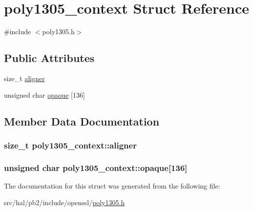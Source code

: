 \hypertarget{structpoly1305__context}{}\section{poly1305\+\_\+context Struct Reference}
\label{structpoly1305__context}


{\ttfamily \#include $<$poly1305.\+h$>$}

\subsection*{Public Attributes}
\begin{DoxyCompactItemize}
\item 
size\+\_\+t \hyperlink{structpoly1305__context_acbc79e70ed9f3a3c8f390b5cf90e1dbd}{aligner}
\item 
unsigned char \hyperlink{structpoly1305__context_a111e7a0f141ae3cb557d37efe613407a}{opaque} \mbox{[}136\mbox{]}
\end{DoxyCompactItemize}


\subsection{Member Data Documentation}
\subsubsection[{\texorpdfstring{aligner}{aligner}}]{\setlength{\rightskip}{0pt plus 5cm}size\+\_\+t poly1305\+\_\+context\+::aligner}\hypertarget{structpoly1305__context_acbc79e70ed9f3a3c8f390b5cf90e1dbd}{}\label{structpoly1305__context_acbc79e70ed9f3a3c8f390b5cf90e1dbd}
\subsubsection[{\texorpdfstring{opaque}{opaque}}]{\setlength{\rightskip}{0pt plus 5cm}unsigned char poly1305\+\_\+context\+::opaque\mbox{[}136\mbox{]}}\hypertarget{structpoly1305__context_a111e7a0f141ae3cb557d37efe613407a}{}\label{structpoly1305__context_a111e7a0f141ae3cb557d37efe613407a}


The documentation for this struct was generated from the following file\+:\begin{DoxyCompactItemize}
\item 
src/hal/pb2/include/openssl/\hyperlink{poly1305_8h}{poly1305.\+h}\end{DoxyCompactItemize}
